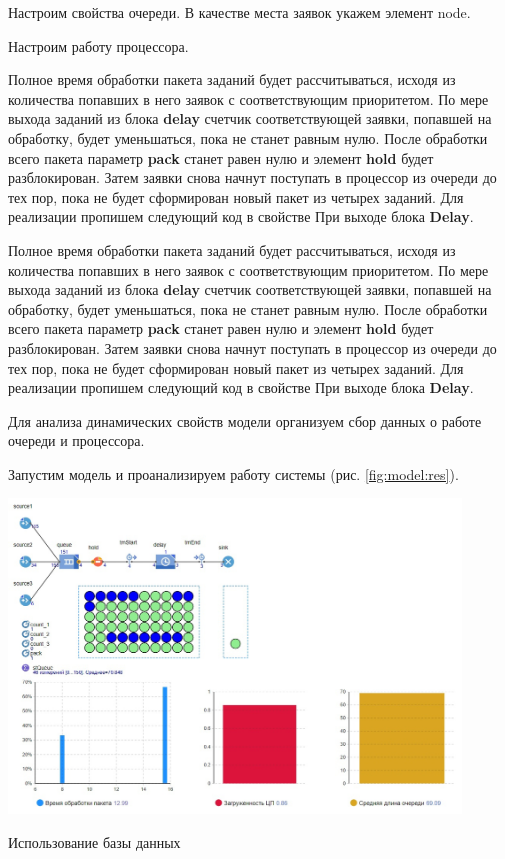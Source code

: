 Настроим свойства очереди. В качестве места
заявок укажем элемент node.\par
Настроим работу процессора.\par
Полное время обработки пакета заданий будет
рассчитываться, исходя из количества попавших в него
заявок с соответствующим приоритетом. По мере выхода
заданий из блока \textbf{delay} счетчик соответствующей заявки,
попавшей на обработку, будет уменьшаться, пока не станет
равным нулю. После обработки всего пакета параметр \textbf{pack}
станет равен нулю и элемент \textbf{hold} будет разблокирован.
Затем заявки снова начнут поступать в процессор из
очереди до тех пор, пока не будет сформирован новый
пакет из четырех заданий. Для реализации пропишем
следующий код в свойстве При выходе блока \textbf{Delay}.\par
Полное время обработки пакета заданий будет
рассчитываться, исходя из количества попавших в него
заявок с соответствующим приоритетом. По мере выхода
заданий из блока \textbf{delay} счетчик соответствующей заявки,
попавшей на обработку, будет уменьшаться, пока не станет
равным нулю. После обработки всего пакета параметр \textbf{pack}
станет равен нулю и элемент \textbf{hold} будет разблокирован.
Затем заявки снова начнут поступать в процессор из
очереди до тех пор, пока не будет сформирован новый
пакет из четырех заданий. Для реализации пропишем
следующий код в свойстве При выходе блока \textbf{Delay}.\par
Для анализа динамических свойств модели
организуем сбор данных о работе очереди и процессора.\par
Запустим модель и проанализируем работу системы
(рис. \ref{fig:model:res}).

\begin{image}
	\includegraphics[width=0.9\textwidth]{model-result}
	\caption{Использование базы данных}
	\label{fig:model:res}
\end{image}

